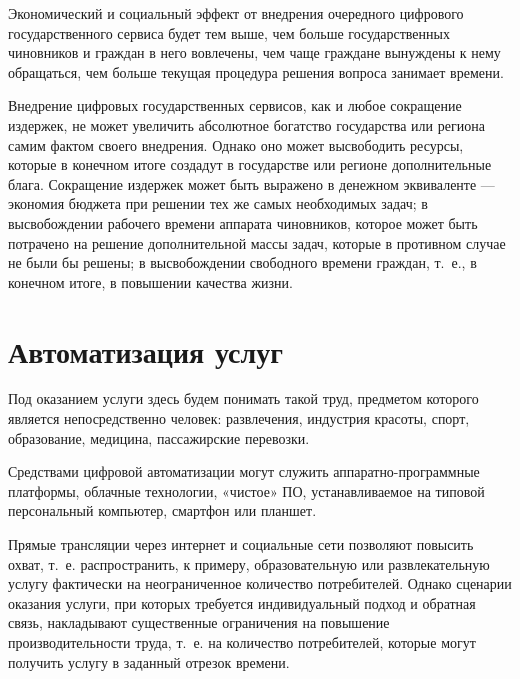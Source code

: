 \documentclass{article}
\begin{document}
Экономический и социальный эффект от внедрения очередного цифрового государственного сервиса будет тем выше, чем больше государственных чиновников и граждан в него вовлечены, чем чаще граждане вынуждены к нему обращаться, чем больше текущая процедура решения вопроса занимает времени.

Внедрение цифровых государственных сервисов, как и любое сокращение издержек, не может увеличить абсолютное богатство государства или региона самим фактом своего внедрения. Однако оно может высвободить ресурсы, которые в конечном итоге создадут в государстве или регионе дополнительные блага. Сокращение издержек может быть выражено в денежном эквиваленте — экономия бюджета при решении тех же самых необходимых задач; в высвобождении рабочего времени аппарата чиновников, которое может быть потрачено на решение дополнительной массы задач, которые в противном случае не были бы решены; в высвобождении свободного времени граждан, т. е., в конечном итоге, в повышении качества жизни.

\section*{Автоматизация услуг}

Под оказанием услуги здесь будем понимать такой труд, предметом которого является непосредственно человек: развлечения, индустрия красоты, спорт, образование, медицина, пассажирские перевозки.

Средствами цифровой автоматизации могут служить аппаратно-программные платформы, облачные технологии, «чистое» ПО, устанавливаемое на типовой персональный компьютер, смартфон или планшет.

Прямые трансляции через интернет и социальные сети позволяют повысить охват, т. е. распространить, к примеру, образовательную или развлекательную услугу фактически на неограниченное количество потребителей. Однако сценарии оказания услуги, при которых требуется индивидуальный подход и обратная связь, накладывают существенные ограничения на повышение производительности труда, т. е. на количество потребителей, которые могут получить услугу в заданный отрезок времени.
\end{document}
